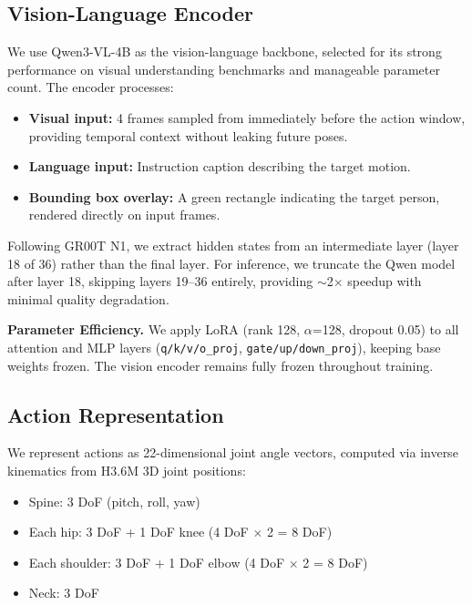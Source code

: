 \documentclass[letterpaper, 10pt, conference]{ieeeconf}
\begin{document}
\subsection{Vision-Language Encoder}

We use Qwen3-VL-4B as the vision-language backbone, selected for its strong performance on visual understanding benchmarks and manageable parameter count. The encoder processes:

\begin{itemize}
    \item \textbf{Visual input:} 4 frames sampled from immediately before the action window, providing temporal context without leaking future poses.
    \item \textbf{Language input:} Instruction caption describing the target motion.
    \item \textbf{Bounding box overlay:} A green rectangle indicating the target person, rendered directly on input frames.
\end{itemize}

Following GR00T N1, we extract hidden states from an intermediate layer (layer 18 of 36) rather than the final layer. For inference, we truncate the Qwen model after layer 18, skipping layers 19--36 entirely, providing $\sim$2$\times$ speedup with minimal quality degradation.

\textbf{Parameter Efficiency.} We apply LoRA (rank 128, $\alpha$=128, dropout 0.05) to all attention and MLP layers (\texttt{q/k/v/o\_proj}, \texttt{gate/up/down\_proj}), keeping base weights frozen. The vision encoder remains fully frozen throughout training.

\subsection{Action Representation}
\label{sec:action_rep}

We represent actions as 22-dimensional joint angle vectors, computed via inverse kinematics from H3.6M 3D joint positions:

\begin{itemize}
    \item Spine: 3 DoF (pitch, roll, yaw)
    \item Each hip: 3 DoF + 1 DoF knee (4 DoF $\times$ 2 = 8 DoF)
    \item Each shoulder: 3 DoF + 1 DoF elbow (4 DoF $\times$ 2 = 8 DoF)
    \item Neck: 3 DoF
\end{itemize}
\end{document}
